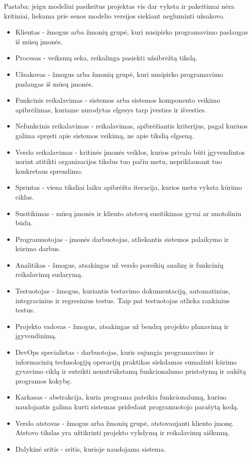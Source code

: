 \documentclass{VUMIFPSkursinis}
\begin{document}
	Pastaba: jeigu modeliui pasikeitus projektas vis dar vyksta ir pakeitimai nėra kritiniai, liekama prie senos modelio versijos siekiant negluminti užsakovo.	

	\begin{itemize}
		\item{Klientas - žmogus arba žmonių grupė, kuri nusipirko programavimo paslaugas iš mūsų įmonės.}
		\item{Procesas - veiksmų seka, reikalinga pasiekti užsibrėžtą tikslą.}
		\item{Užsakovas - žmogus arba žmonių grupė, kuri nusipirko programavimo paslaugas iš mūsų įmonės.}
		\item{Funkcinis reikalavimas - sistemos arba sistemos komponento veikimo apibrėžimas, kuriame nurodytas elgesys tarp įvesties ir išvesties.}
		\item{Nefunkcinis reikalavimas - reikalavimas, apibrėžiantis kriterijus, pagal kuriuos galima spręsti apie sistemos veikimą, ne apie tikslią elgseną.}
		\item{Verslo reikalavimas - kritinės įmonės veiklos, kurios privalo būti įgyvendintos norint atitikti organizacijos tikslus tuo pačiu metu, nepriklausant tuo konkretaus sprendimo.}
		\item{Sprintas - viena tiksliai laiku apibrėžta iteracija, kurios metu vyksta kūrimo ciklas.}
		\item{Susitikimas - mūsų įmonės ir kliento atstovų susitikimas gyvai ar nuotoliniu būdu.}
		\item{Programuotojas - įmonės darbuotojas, atliekantis sistemos palaikymo ir kūrimo darbus.}
		\item{Analitikas - žmogus, atsakingas už verslo poreikių analizę ir funkcinių reikalavimų sudarymą.}
		\item{Testuotojas - žmogus, kuriantis testavimo dokumentaciją, automatinius, integracinius ir regresinius testus. Taip pat testuotojas atlieka rankinius testus.}
		\item{Projekto vadovas - žmogus, atsakingas už bendrą projekto planavimą ir įgyvendinimą.}
		\item{DevOps specialistas - darbuotojas, kuris sujungia programavimo ir informacinių technologijų operacijų praktikas siekdamas sumažinti kūrimo gyvavimo ciklą ir suteikti nenutrūkstamą funkcionalumo pristatymą ir aukštą programos kokybę.}
		\item{Karkasas - abstrakcija, kuria programa pateikia funkcionalumą, kuriuo naudojantis galima kurti sistemas pridedant programuotojo parašytą kodą.}
		\item{Verslo atstovas - žmogus arba žmonių grupė, atstovaujanti kliento įmonę. Atstovo tikslas yra užtikrinti projekto vykdymą ir reikalavimų aiškumą.}
		\item{Dalykinė sritis - sritis, kurioje naudojama sistema.}
	\end{itemize}
\end{document}
